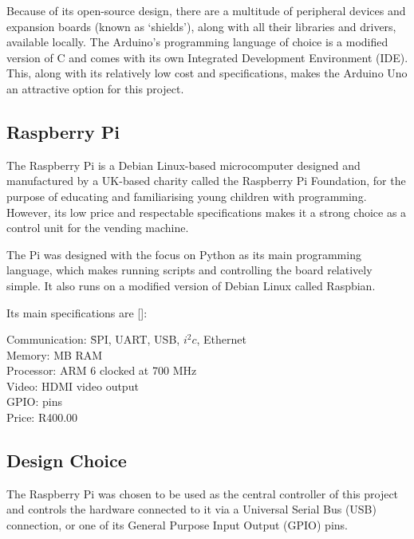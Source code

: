 Because of its open-source design, there are a multitude of peripheral devices and expansion
boards (known as `shields'), along with all their libraries and drivers,
available locally. The Arduino's programming language of choice is a modified version of
C and comes with its own Integrated Development Environment (IDE). This, along
with its relatively low cost and specifications, makes the Arduino Uno
an attractive option for this project.

\subsection{Raspberry Pi}
\label{sec:raspi}

The Raspberry Pi is a Debian Linux-based microcomputer
designed and manufactured by a UK-based charity called the Raspberry Pi Foundation, for the
purpose of educating and familiarising young children with programming. However, its low price
and respectable specifications makes it a strong choice as a control unit for the vending
machine.

The Pi was designed with the focus on Python as its main programming language, which makes
running scripts and controlling the board relatively simple. It also runs on a modified
version of Debian Linux called Raspbian.

Its main specifications are [\cite{website:raspi-specs}]:

\begin{tabbing}

Communication: \= SPI, UART, USB, $i^2c$, Ethernet \\ 
Memory:  MB RAM \\
Processor: \> ARM 6 clocked at 700 MHz \\
Video: \> HDMI video output \\
GPIO:  pins \\
Price: \> R400.00 \\

\end{tabbing} 

\subsection{Design Choice}

The Raspberry Pi was chosen to be used as the central controller of this project and
controls the hardware connected to it via a Universal Serial Bus (USB) connection, or one of
its General Purpose Input Output (GPIO) pins.

